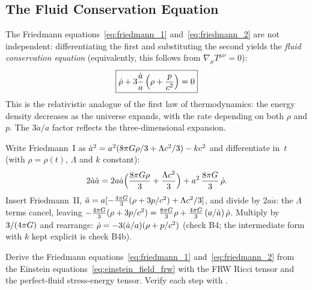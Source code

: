 \subsection{The Fluid Conservation Equation}
\label{sec:fluid_conservation}

The Friedmann equations~\eqref{eq:friedmann_1} and~\eqref{eq:friedmann_2}
are not independent: differentiating the first and substituting the
second yields the \emph{fluid conservation equation} (equivalently,
this follows from $\nabla_\mu T^{\mu\nu} = 0$):
\begin{equation}
    \boxed{
    \dot{\rho} + 3\frac{\dot{a}}{a}
    \left(\rho + \frac{p}{c^2}\right) = 0
    }
    \label{eq:fluid_conservation}
\end{equation}
This is the relativistic analogue of the first law of thermodynamics:
the energy density decreases as the universe expands, with the rate
depending on both $\rho$ and $p$.  The $3\dot{a}/a$ factor reflects
the three-dimensional expansion.


\begin{derivation}
Write Friedmann~I as $\dot a^2 = a^2(8\pi G\rho/3 + \Lambda c^2/3)
- kc^2$ and differentiate in~$t$ (with $\rho = \rho(t)$, $\Lambda$ and
$k$ constant):
\[
  2\dot a\ddot a = 2a\dot a\Bigl(\frac{8\pi G\rho}{3} + \frac{\Lambda c^2}{3}\Bigr)
  + a^2\,\frac{8\pi G}{3}\,\dot\rho .
\]
Insert Friedmann~II, $\ddot a = a[-\tfrac{4\pi G}{3}(\rho + 3p/c^2)
+ \Lambda c^2/3]$, and divide by $2a\dot a$: the $\Lambda$ terms cancel,
leaving $-\tfrac{4\pi G}{3}(\rho + 3p/c^2)
= \tfrac{8\pi G}{3}\rho + \tfrac{4\pi G}{3}\,(a/\dot a)\,\dot\rho$.
Multiply by $3/(4\pi G)$ and rearrange:
$\dot\rho = -3(\dot a/a)(\rho + p/c^2)$ (check B4; the
intermediate form with $k$ kept explicit is check B4b).
\end{derivation}
\begin{exercise}
\label{ex:derive_friedmann}
Derive the Friedmann equations~\eqref{eq:friedmann_1}
and~\eqref{eq:friedmann_2} from the Einstein
equations~\eqref{eq:einstein_field_frw} with the FRW Ricci
tensor and the perfect-fluid stress-energy tensor.  Verify each step
with
.
\end{exercise}


